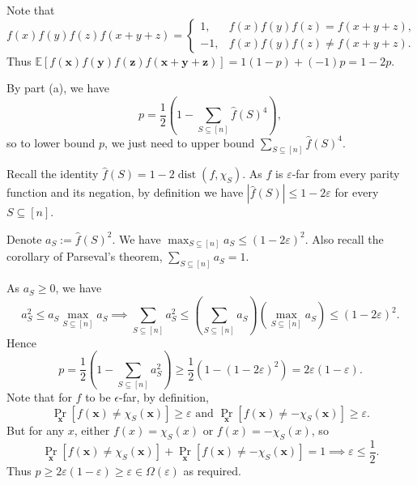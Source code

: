 \documentclass[12pt]{article}
\newcommand{\x}{\bm{x}}
\newcommand{\y}{\bm{y}}
\newcommand{\z}{\bm{z}}
\newcommand{\E}{\mathbb{E}}
\DeclareMathOperator{\dist}{dist}
\begin{document}
\begin{enumerate}[label=\alph*., font=\bfseries]
Note that $$f(x)f(y)f(z)f(x+y+z)=\begin{cases}1,&f(x)f(y)f(z)=f(x+y+z),\\-1,&f(x)f(y)f(z)\ne f(x+y+z).\end{cases}$$
Thus $\E\left[f(\x)f(\y)f(\z)f(\x+\y+\z)\right]=1(1-p)+(-1)p=1-2p$.

By part (a), we have $$p=\frac{1}{2}\left(1-\sum_{S\subseteq[n]}\hat f(S)^4\right),$$
so to lower bound $p$, we just need to upper bound $\sum_{S\subseteq[n]}\hat f(S)^4$.

Recall the identity $\hat f(S)=1-2\dist\left(f,\chi_S\right)$. As $f$ is $\varepsilon$-far from every parity function and its negation, by definition we have $\left|\hat f(S)\right|\le1-2\varepsilon$ for every $S\subseteq[n]$.

Denote $a_S:=\hat f(S)^2$. We have $\max_{S\subseteq[n]}a_S\le(1-2\varepsilon)^2$. Also recall the corollary of Parseval's theorem, $\sum_{S\subseteq[n]}a_S=1$.

As $a_S\ge 0$, we have $$a_S^2\le a_S\max_{S\subseteq[n]}a_S\implies\sum_{S\subseteq[n]}a_S^2\le\left(\sum_{S\subseteq[n]}a_S\right)\left(\max_{S\subseteq[n]}a_S\right)\le(1-2\varepsilon)^2.$$
Hence $$p=\frac{1}{2}\left(1-\sum_{S\subseteq[n]}a_S^2\right)\ge\frac{1}{2}\left(1-(1-2\varepsilon)^2\right)=2\varepsilon(1-\varepsilon).$$
Note that for $f$ to be $\epsilon$-far, by definition, $$\Pr_{\x}\left[f(\x)\ne\chi_S(\x)\right]\ge\varepsilon\text{ and }\Pr_{\x}\left[f(\x)\ne-\chi_S(\x)\right]\ge\varepsilon.$$
But for any $x$, either $f(x)=\chi_S(x)$ or $f(x)=-\chi_S(x)$, so
$$\Pr_{\x}\left[f(\x)\ne\chi_S(\x)\right]+\Pr_{\x}\left[f(\x)\ne-\chi_S(\x)\right]=1\implies\varepsilon\le\frac 1 2.$$
Thus $p\ge2\varepsilon(1-\varepsilon)\ge\varepsilon\in\Omega(\varepsilon)$ as required.
\end{enumerate}
\newpage
\end{document}
